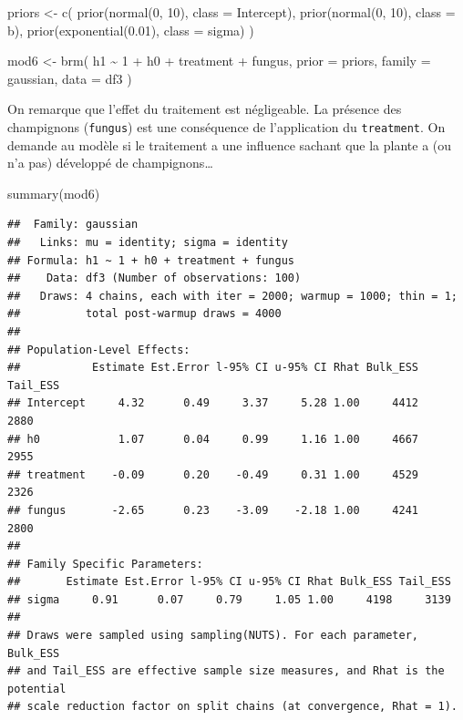 \documentclass[
  a4paper,11pt,twoside,onecolumn,openright,final,oldfontcommands]{memoir}
\newenvironment{Shaded}{\begin{snugshade}}{\end{snugshade}}
\newcommand{\AttributeTok}[1]{\textcolor[rgb]{0.77,0.63,0.00}{#1}}
\newcommand{\DecValTok}[1]{\textcolor[rgb]{0.00,0.00,0.81}{#1}}
\newcommand{\FloatTok}[1]{\textcolor[rgb]{0.00,0.00,0.81}{#1}}
\newcommand{\FunctionTok}[1]{\textcolor[rgb]{0.00,0.00,0.00}{#1}}
\newcommand{\NormalTok}[1]{#1}
\newcommand{\OtherTok}[1]{\textcolor[rgb]{0.56,0.35,0.01}{#1}}
\newcommand{\SpecialCharTok}[1]{\textcolor[rgb]{0.00,0.00,0.00}{#1}}
\theoremstyle{definition}
\theoremstyle{definition}
\theoremstyle{definition}
\theoremstyle{definition}
\theoremstyle{remark}
\begin{document}
\begin{Shaded}
\begin{Highlighting}[]
\NormalTok{priors }\OtherTok{\textless{}{-}} \FunctionTok{c}\NormalTok{(}
  \FunctionTok{prior}\NormalTok{(}\FunctionTok{normal}\NormalTok{(}\DecValTok{0}\NormalTok{, }\DecValTok{10}\NormalTok{), }\AttributeTok{class =}\NormalTok{ Intercept),}
  \FunctionTok{prior}\NormalTok{(}\FunctionTok{normal}\NormalTok{(}\DecValTok{0}\NormalTok{, }\DecValTok{10}\NormalTok{), }\AttributeTok{class =}\NormalTok{ b),}
  \FunctionTok{prior}\NormalTok{(}\FunctionTok{exponential}\NormalTok{(}\FloatTok{0.01}\NormalTok{), }\AttributeTok{class =}\NormalTok{ sigma)}
\NormalTok{  )}

\NormalTok{mod6 }\OtherTok{\textless{}{-}} \FunctionTok{brm}\NormalTok{(}
\NormalTok{  h1 }\SpecialCharTok{\textasciitilde{}} \DecValTok{1} \SpecialCharTok{+}\NormalTok{ h0 }\SpecialCharTok{+}\NormalTok{ treatment }\SpecialCharTok{+}\NormalTok{ fungus,}
  \AttributeTok{prior =}\NormalTok{ priors,}
  \AttributeTok{family =}\NormalTok{ gaussian,}
  \AttributeTok{data =}\NormalTok{ df3}
\NormalTok{  )}
\end{Highlighting}
\end{Shaded}

On remarque que l'effet du traitement est négligeable. La présence des champignons (\texttt{fungus}) est une conséquence de l'application du \texttt{treatment}. On demande au modèle si le traitement a une influence sachant que la plante a (ou n'a pas) développé de champignons\ldots{}

\begin{Shaded}
\begin{Highlighting}[]
\FunctionTok{summary}\NormalTok{(mod6)}
\end{Highlighting}
\end{Shaded}

\begin{verbatim}
##  Family: gaussian 
##   Links: mu = identity; sigma = identity 
## Formula: h1 ~ 1 + h0 + treatment + fungus 
##    Data: df3 (Number of observations: 100) 
##   Draws: 4 chains, each with iter = 2000; warmup = 1000; thin = 1;
##          total post-warmup draws = 4000
## 
## Population-Level Effects: 
##           Estimate Est.Error l-95% CI u-95% CI Rhat Bulk_ESS Tail_ESS
## Intercept     4.32      0.49     3.37     5.28 1.00     4412     2880
## h0            1.07      0.04     0.99     1.16 1.00     4667     2955
## treatment    -0.09      0.20    -0.49     0.31 1.00     4529     2326
## fungus       -2.65      0.23    -3.09    -2.18 1.00     4241     2800
## 
## Family Specific Parameters: 
##       Estimate Est.Error l-95% CI u-95% CI Rhat Bulk_ESS Tail_ESS
## sigma     0.91      0.07     0.79     1.05 1.00     4198     3139
## 
## Draws were sampled using sampling(NUTS). For each parameter, Bulk_ESS
## and Tail_ESS are effective sample size measures, and Rhat is the potential
## scale reduction factor on split chains (at convergence, Rhat = 1).
\end{verbatim}
\end{document}
